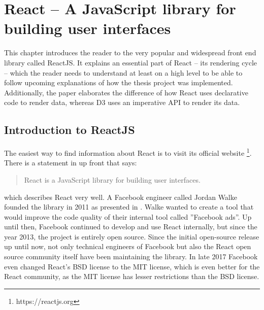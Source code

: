 \chapter{React – A JavaScript library for building user interfaces}
\label{cha:react}

This chapter introduces the reader to the very popular and widespread front end library called ReactJS. It explains an essential part of React -- its rendering cycle -- which the reader needs to understand at least on a high level to be able to follow upcoming explanations of how the thesis project was implemented. Additionally, the paper elaborates the difference of how React uses declarative code to render data, whereas D3 uses an imperative API to render its data.

\section{Introduction to ReactJS}

The easiest way to find information about React is to visit its official website \footnote{https://reactjs.org}. There is a statement in \cite{React} up front that says: \begin{quote}\begin{english}React is a JavaScript library for building user interfaces.\end{english}\end{quote} which describes React very well. A Facebook engineer called Jordan Walke founded the library in 2011 as presented in \cite[05:30]{ReactFoundingVideo}. Walke wanted to create a tool that would improve the code quality of their internal tool called ''Facebook ads''. Up until then, Facebook continued to develop and use React internally, but since the year 2013, the project is entirely open source. Since the initial open-source release up until now, not only technical engineers of Facebook but also the React open source community itself have been maintaining the library. In late 2017 Facebook even changed React's BSD license to the MIT license, which is even better for the React community, as the MIT license has lesser restrictions than the BSD license.

